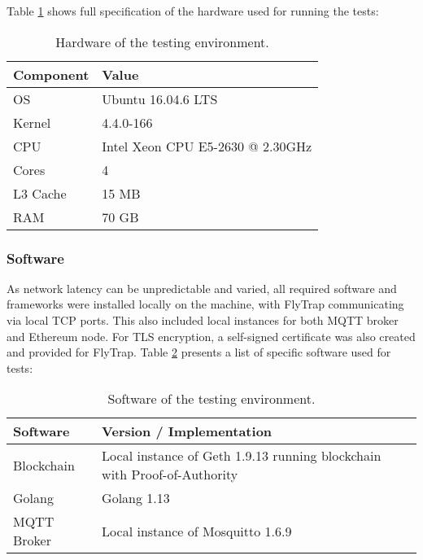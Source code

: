 Table \ref{tab:hw} shows full specification of the hardware used for running the tests:
\begin{table}[h]
\centering
\begin{tabular}{|l|l|}
\hline
\textbf{Component} & \textbf{Value}                   \\ \hline
OS                 & Ubuntu 16.04.6 LTS               \\ \hline
Kernel             & 4.4.0-166                        \\ \hline
CPU                & Intel Xeon CPU E5-2630 @ 2.30GHz \\ \hline
Cores              & 4                                \\ \hline
L3 Cache           & 15 MB                            \\ \hline
RAM                & 70 GB                            \\ \hline
\end{tabular}
\caption{Hardware of the testing environment.}
\label{tab:hw}
\end{table}
\subsubsection{Software}
As network latency can be unpredictable and varied, all required software and frameworks were installed locally on the machine, with FlyTrap communicating via local TCP ports. This also included local instances for both MQTT broker and Ethereum node. For TLS encryption, a self-signed certificate was also created and provided for FlyTrap. Table \ref{tab:sw} presents a list of specific software used for tests:

\begin{table}[h]
\centering
\begin{tabular}{|l|l|}
\hline
\textbf{Software} & \textbf{Version / Implementation}                                        \\ \hline
Blockchain        & Local instance of Geth 1.9.13 running blockchain with Proof-of-Authority \\ \hline
Golang            & Golang 1.13                                                              \\ \hline
MQTT Broker       & Local instance of Mosquitto 1.6.9                                        \\ \hline
\end{tabular}
\caption{Software of the testing environment.}
\label{tab:sw}
\end{table}

